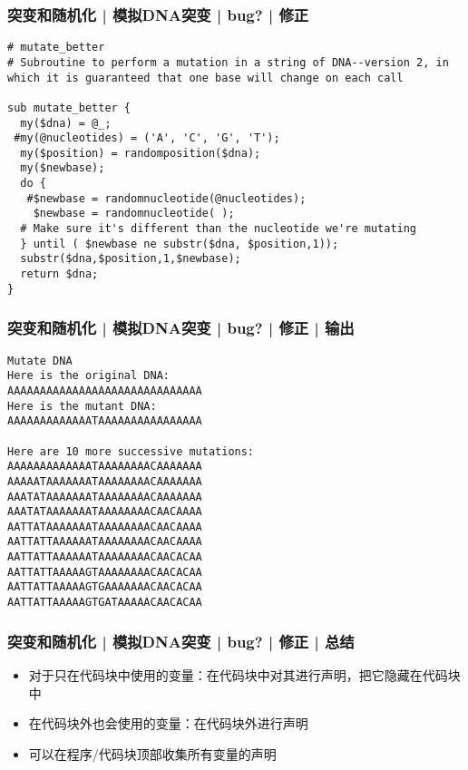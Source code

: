 \begin{frame}[fragile]
  \frametitle{突变和随机化 | 模拟DNA突变 | bug? | \alert{修正}}
  \vspace{-1.5em}
\begin{lstlisting}[basicstyle=\footnotesize\tt]
# mutate_better
# Subroutine to perform a mutation in a string of DNA--version 2, in which it is guaranteed that one base will change on each call

sub mutate_better {
  my($dna) = @_;
 #my(@nucleotides) = ('A', 'C', 'G', 'T');
  my($position) = randomposition($dna);
  my($newbase);
  do {
   #$newbase = randomnucleotide(@nucleotides);
    $newbase = randomnucleotide( );
  # Make sure it's different than the nucleotide we're mutating
  } until ( $newbase ne substr($dna, $position,1));
  substr($dna,$position,1,$newbase);
  return $dna;
}
\end{lstlisting}
\end{frame}

\begin{frame}[fragile]
  \frametitle{突变和随机化 | 模拟DNA突变 | bug? | 修正 | 输出}
  \vspace{-1.5em}
\begin{lstlisting}[basicstyle=\small\tt,numberstyle=\footnotesize]
Mutate DNA
Here is the original DNA:
AAAAAAAAAAAAAAAAAAAAAAAAAAAAAA
Here is the mutant DNA:
AAAAAAAAAAAAATAAAAAAAAAAAAAAAA

Here are 10 more successive mutations:
AAAAAAAAAAAAATAAAAAAAACAAAAAAA
AAAAATAAAAAAATAAAAAAAACAAAAAAA
AAATATAAAAAAATAAAAAAAACAAAAAAA
AAATATAAAAAAATAAAAAAAACAACAAAA
AATTATAAAAAAATAAAAAAAACAACAAAA
AATTATTAAAAAATAAAAAAAACAACAAAA
AATTATTAAAAAATAAAAAAAACAACACAA
AATTATTAAAAAGTAAAAAAAACAACACAA
AATTATTAAAAAGTGAAAAAAACAACACAA
AATTATTAAAAAGTGATAAAAACAACACAA
\end{lstlisting}
\end{frame}

\begin{frame}
  \frametitle{突变和随机化 | 模拟DNA突变 | bug? | 修正 | \alert{总结}}
  \begin{itemize}
    \item 对于只在代码块中使用的变量：在代码块中对其进行声明，把它隐藏在代码块中
    \item 在代码块外也会使用的变量：在代码块外进行声明
    \item 可以在程序/代码块顶部收集所有变量的声明
  \end{itemize}
\end{frame}


